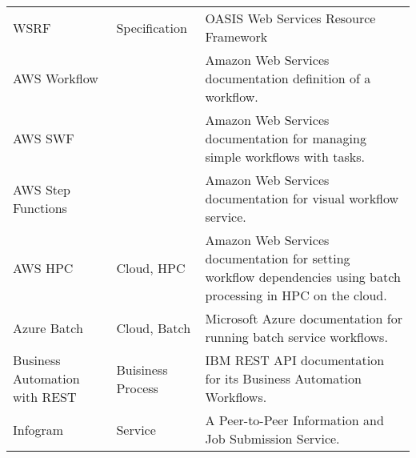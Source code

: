 \begin{table*}[htb]
{{\begin{tabular}{|p{3cm}|p{3cm}|p{10cm}|}
  WSRF \cite{www-wsrf} & Specification & OASIS Web Services Resource Framework\\

AWS Workflow \cite{www-aws-workflow} & & Amazon Web Services documentation definition of a workflow.\\
\hline

AWS SWF \cite{www-aws-swf} & & Amazon Web Services documentation for managing simple workflows with tasks. \\
\hline

AWS Step Functions \cite{www-aws-stepfunctions} & & Amazon Web Services documentation for visual workflow service. \\
\hline

AWS HPC  \cite{www-aws-batch-workflow} & Cloud, HPC & Amazon Web Services documentation for setting workflow dependencies using batch processing in HPC on the cloud. \\
\hline

Azure Batch \cite{www-azure-batch} & Cloud, Batch & Microsoft Azure documentation for running batch service workflows. \\
  \hline

 Business Automation with REST \cite{www-business-rest-ibm} & Buisiness
                                        Process& IBM REST API documentation for its Business Automation Workflows. \\
\hline

  


Infogram \cite{las-02-infogram} & Service & A Peer-to-Peer Information and Job Submission Service.\\
\hline
\end{tabular}
}
}
\end{table*}
